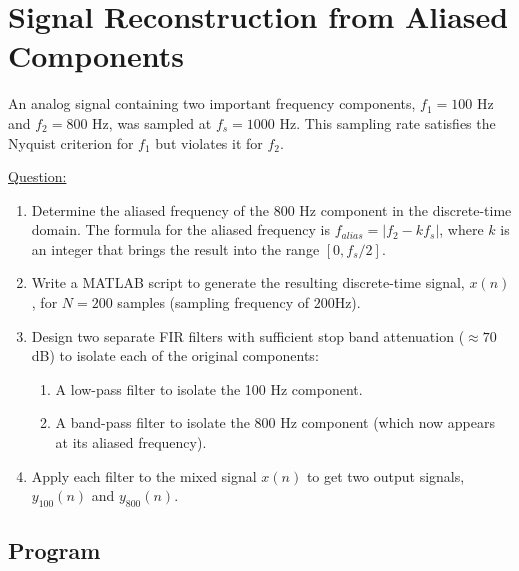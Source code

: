 \pagebreak
\section{Signal Reconstruction from Aliased Components}
An analog signal containing two important frequency components, $f_1=100$ Hz and $f_2=800$ Hz, was sampled at $f_s=1000$ Hz. This sampling rate satisfies the Nyquist criterion for $f_1$ but violates it for $f_2$.

\underline{Question:}
\begin{enumerate}
	\item Determine the aliased frequency of the 800 Hz component in the discrete-time domain. The formula for the aliased frequency is $f_{alias}=|f_2-k f_s|$, where $k$ is an integer that brings the result into the range $[0,f_s/2]$.
	\item Write a MATLAB script to generate the resulting discrete-time signal, $x(n)$, for $N=200$ samples (sampling frequency of $200$Hz).
	\item Design two separate FIR filters with sufficient stop band attenuation ($\approx 70$dB) to isolate each of the original components:
	\begin{enumerate}
		\item A low-pass filter to isolate the 100 Hz component.
		\item A band-pass filter to isolate the 800 Hz component (which now appears at its aliased frequency).
	\end{enumerate}
	\item Apply each filter to the mixed signal $x(n)$ to get two output signals, $y_{100}(n)$ and $y_{800}(n)$.
\end{enumerate}

\subsection*{Program}


\begin{figure*}[ht!]
	\begin{minipage}{.48\textwidth}
		\vspace*{10pt}
	\end{minipage}%
	\hfill%
	\begin{minipage}{.48\textwidth}
		\vspace*{10pt}
	\end{minipage}
\end{figure*}
